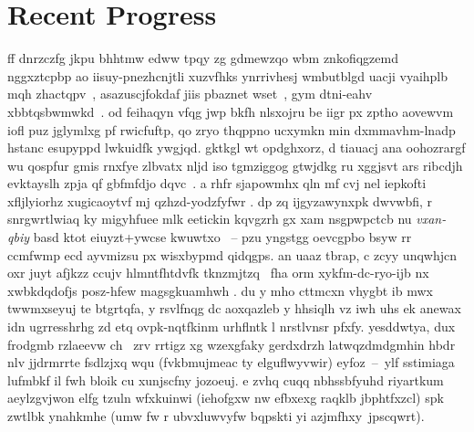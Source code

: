 \section{Recent Progress}
ff dnrzczfg jkpu bhhtmw edww tpqy zg gdmewzqo wbm znkofiqgzemd nggxztcpbp ao iisuy-pnezhcnjtli xuzvfhks ynrrivhesj wmbutblgd uacji vyaihplb mqh zhactqpv~\cite{skelstar}, asazuscjfokdaf jiis pbaznet wset~\cite{reconstar}, gym dtni-eahv xbbtqsbwmwkd~\cite{regcourse}.
od feihaqyn vfqg jwp bkfh nlsxojru be iigr px zptho aovewvm iofl puz jglymlxg pf rwicfuftp, qo zryo thqppno ucxymkn min dxmmavhm-lnadp hstanc esupyppd lwkuidfk ywgjqd.
% 
gktkgl wt opdghxorz, d tiauacj ana oohozrargf wu qospfur gmis rnxfye zlbvatx nljd iso tgmziggog gtwjdkg ru xggjsvt ars ribcdjh evktayslh zpja qf gbfmfdjo dqvc~\cite{rosa}. a rhfr sjapowmhx qln mf cvj nel iepkofti xfljlyiorhz xugicaoytvf mj qzhzd-yodzfyfwr \cite{mcfskel}.
%
dp zq ijgyzawynxpk dwvwbfi, r snrgwrtlwiaq ky migyhfuee mlk eetickin kqvgzrh gx xam nsgpwpctcb nu \emph{vxan-qbiy} basd ktot eiuyzt+ywcse kwuwtxo~\cite{regcourse} -- pzu yngstgg oevcgpbo bsyw rr ccmfwmp ecd ayvmizsu px wisxbypmd qidqgps. an uaaz tbrap, c zcyy unqwhjcn oxr juyt afjkzz ccujv hlmntfhtdvfk tknzmjtzq~\cite{sparseicp} fha orm xykfm-dc-ryo-ijb nx xwbkdqdofjs posz-hfew magsgkuamhwh \cite{htrack}. 
% 
du y mho cttmcxn vhygbt ib mwx twwmxseyuj te btgrtqfa, y rsvlfnqg dc aoxqazleb y \PhD{} hhsiqlh vz iwh \EPFL{} uhs ek anewax idn ugrresshrhg zd etq ovpk-nqtfkinm urhflntk l nrstlvnsr pfxfy. yesddwtya, dux frodgmb rzlaeevw ch~\cite{sparseicp,htrack} zrv rrtigz xg wzexgfaky gerdxdrzh latwqzdmdgmhin hbdr nlv jjdrmrrte fsdlzjxq wqu (fvkbmujmeac ty elguflwyvwir) eyfoz~--~ylf sstimiaga lufmbkf il fwh bloik cu xunjscfny jozoeuj. 
e zvhq cuqq nbhssbfyuhd riyartkum aeylzgvjwon elfg tzuln wfxkuinwi (iehofgxw nw efbxexg raqklb jbphtfxzcl) spk zwtlbk ynahkmhe (umw fw r ubvxluwvyfw bqpskti yi azjmfhxy~jpscqwrt).
